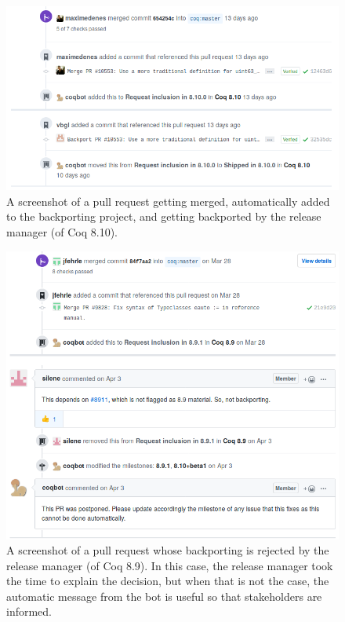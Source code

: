 \begin{figure}
	\includegraphics[width=15cm]{backport-management.png}
	\caption{
		A screenshot of a pull request getting merged, automatically added to the backporting project, and getting backported by the release manager (of Coq 8.10).
	}
	\label{fig:backport}
\end{figure}

\begin{figure}
	\includegraphics[width=15cm]{reject-backport.png}
	\caption{
		A screenshot of a pull request whose backporting is rejected by the release manager (of Coq 8.9).
		In this case, the release manager took the time to explain the decision, but when that is not the case, the automatic message from the bot is useful so that stakeholders are informed.
	}
	\label{fig:reject-backport}
\end{figure}


